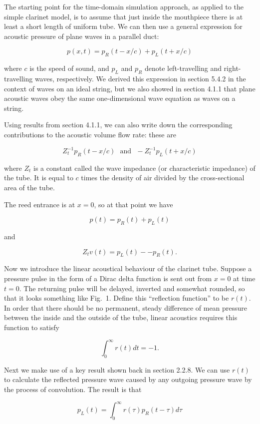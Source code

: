   The starting point for the time-domain simulation approach, as applied to the 
  simple clarinet model, is to assume that just inside the mouthpiece there is 
  at least a short length of uniform tube. We can then use a general expression 
  for acoustic pressure of plane waves in a parallel duct: 

  $$p(x,t) = p_R(t-x/c) + p_L(t+x/c) \tag{1}$$ 

  where $c$ is the speed of sound, and $p_L$ and $p_R$ denote left-travelling 
  and right-travelling waves, respectively. We derived this expression in 
  section 5.4.2 in the context of waves on an ideal string, but we also showed 
  in section 4.1.1 that plane acoustic waves obey the same one-dimensional wave 
  equation as waves on a string. 

  Using results from section 4.1.1, we can also write down the corresponding 
  contributions to the acoustic volume flow rate: these are 

  $$Z_t^{-1}p_R(t-x/c) \mathrm{~~~and~~~} -Z_t^{-1}p_L(t+x/c) \tag{2}$$ 

  where $Z_t$ is a constant called the wave impedance (or characteristic 
  impedance) of the tube. It is equal to $c$ times the density of air divided 
  by the cross-sectional area of the tube. 

  The reed entrance is at $x=0$, so at that point we have 

  $$p(t)=p_R(t) + p_L(t) \tag{3}$$ 

  and 

  $$Z_t v(t)=p_L(t) -- p_R(t) . \tag{4}$$ 

  Now we introduce the linear acoustical behaviour of the clarinet tube. 
  Suppose a pressure pulse in the form of a Dirac delta function is sent out 
  from $x=0$ at time $t=0$. The returning pulse will be delayed, inverted and 
  somewhat rounded, so that it looks something like Fig.\ 1. Define this 
  ``reflection function'' to be $r(t)$. In order that there should be no 
  permanent, steady difference of mean pressure between the inside and the 
  outside of the tube, linear acoustics requires this function to satisfy 

  $$\int_0^\infty{r(t) dt} =-1 . \tag{5}$$ 

  Next we make use of a key result shown back in section 2.2.8. We can use 
  $r(t)$ to calculate the reflected pressure wave caused by any outgoing 
  pressure wave by the process of convolution. The result is that 

  $$p_L(t)=\int_0^\infty{r(\tau) p_R(t-\tau) d \tau} \tag{6}$$ 

